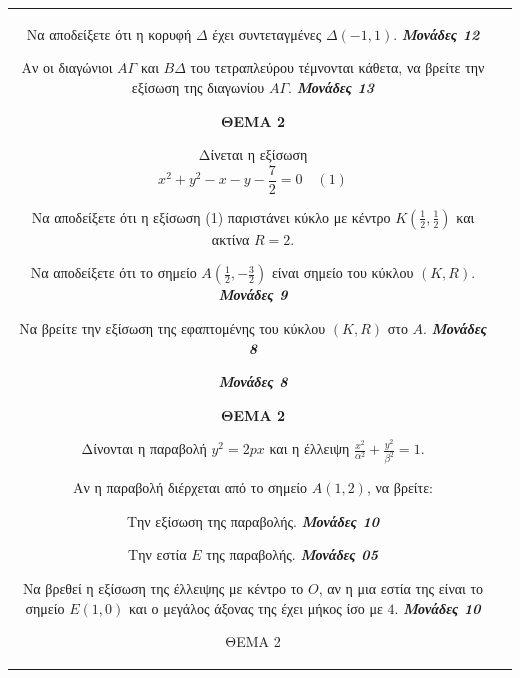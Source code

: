 \documentclass[11pt,a4paper,twoside]{book}
\newcommand{\OnPar}[1]{{\notoserif\bfseries\fontsize{18}{22}\selectfont #1}}
\newcommand{\Askhseis}[1]{{\urwgothic\bfseries\fontsize{16}{19}\selectfont #1}}
\newcommand{\monades}[1]{
\hspace*{\fill}
\textbf{\textit{\textcolor{maincolor}{Μονάδες #1}}}}
\begin{document}
\begin{tabular}{cc}
\begin{alist}    \item Να αποδείξετε ότι η κορυφή $\Delta$ έχει συντεταγμένες $\Delta(-1,1)$. \monades{12}
    \item Αν οι διαγώνιοι $A\Gamma$ και $B\Delta$ του τετραπλεύρου τέμνονται κάθετα, να βρείτε την εξίσωση της διαγωνίου $A\Gamma$. \monades{13}\end{alist}

\vspace{4mm}

\OnPar{ΘΕΜΑ 2}

Δίνεται η εξίσωση
\[ x^2 + y^2 - x - y - \frac{7}{2} = 0 \quad (1) \]

\begin{alist}    \item Να αποδείξετε ότι η εξίσωση (1) παριστάνει κύκλο με κέντρο $K \left(\frac{1}{2}, \frac{1}{2}\right)$ και ακτίνα $R = 2$.
    \item Να αποδείξετε ότι το σημείο $A \left(\frac{1}{2}, -\frac{3}{2}\right)$ είναι σημείο του κύκλου $(K,R)$.  \monades{9}
    \item Να βρείτε την εξίσωση της εφαπτομένης του κύκλου $(K,R)$ στο $A$.  \monades{8}
 \monades{8}\end{alist}

\vspace{4mm}

\Askhseis{ΘΕΜΑ 2}

Δίνονται η παραβολή $y^2 = 2px$ και η έλλειψη $\frac{x^2}{\alpha^2} + \frac{y^2}{\beta^2}=1$.

\begin{alist}    \item Αν η παραβολή διέρχεται από το σημείο $A(1,2)$, να βρείτε:
    \begin{rlist}
        \item Την εξίσωση της παραβολής. \monades{10}
        \item Την εστία $E$ της παραβολής. \monades{05}
    \end{rlist}
    \item Να βρεθεί η εξίσωση της έλλειψης με κέντρο το $O$, αν η μια εστία της είναι το σημείο $E(1,0)$ και ο μεγάλος άξονας της έχει μήκος ίσο με $4$. \monades{10}\end{alist}

\vspace{4mm}

ΘΕΜΑ 2


\end{tabular}
\end{document}
